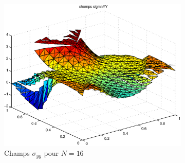 \begin{figure}[h!]
\begin{subfigure}[b]{0.32\textwidth}
  \includegraphics[width=\textwidth]{images/sigmayyN32.eps}
  \caption{Champs $\sigma_{yy}$ pour $N=16$}
  \end{subfigure}
  \caption{}
  \label{fig:ResultatsChampsSigma}
\end{figure}